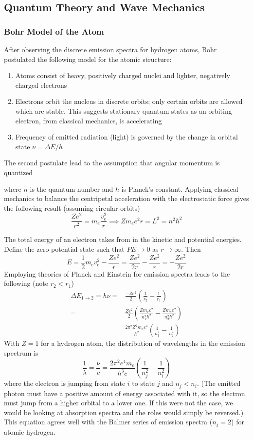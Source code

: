 \documentclass[11pt]{article}
\newcommand{\CenteredBoxed}[1]{\begin{center}\boxed{#1}\end{center}}
\begin{document}
\subsection{Quantum Theory and Wave Mechanics}
\subsubsection{Bohr Model of the Atom}
After observing the discrete emission spectra for hydrogen atoms, Bohr postulated the following model for the atomic structure:
\begin{enumerate}
\item Atoms consist of heavy, positively charged nuclei and lighter, negatively charged electrons
\item Electrons orbit the nucleus in discrete orbits; only certain orbits are allowed which are stable. This suggests stationary quantum states as an orbiting electron, from classical mechanics, is accelerating
\item Frequency of emitted radiation (light) is governed by the change in orbital state $\nu=\Delta E/h$
\end{enumerate}

The second postulate lead to the assumption that angular momentum is quantized
\CenteredBoxed{L = m_ev_er = m_e\omega r = n\frac{h}{2\pi} = n\hbar}
where $n$ is the quantum number and $h$ is Planck's constant. Applying classical mechanics to balance the centripetal acceleration with the electrostatic force gives the following result (assuming circular orbits)
$$\frac{Ze^2}{r^2} = m_e\frac{v_e^2}{r}\implies Zm_ee^2r = L^2 = n^2\hbar^2$$

The total energy of an electron takes from in the kinetic and potential energies. Define the zero potential state such that $PE\to0$ as $r\to\infty$. Then
$$E = \frac{1}{2}m_ev_e^2 -\frac{Ze^2}{r} = \frac{Ze^2}{2r} - \frac{Ze^2}{r} = -\frac{Ze^2}{2r}$$
Employing theories of Planck and Einstein for emission spectra leads to the following (note $r_2 < r_1$)
\begin{align*}
\Delta E_{1\to2} = h\nu =& \frac{-Ze^2}{2}\left(\frac{1}{r_2}-\frac{1}{r_1}\right)\\
=& \frac{Ze^2}{2}\left(\frac{Zm_ee^2}{n_1^2\hbar^2}-\frac{Zm_ee^2}{n_2^2\hbar^2}\right)\\
=& \frac{2\pi^2Z^2m_ee^4}{h^2}\left(\frac{1}{n_1^2}-\frac{1}{n_2^2}\right)
\end{align*}
With $Z=1$ for a hydrogen atom, the distribution of wavelengths in the emission spectrum is
$$\frac{1}{\lambda}=\frac{\nu}{c} = \frac{2\pi^2e^4m_e}{h^3c}\left(\frac{1}{n_j^2} - \frac{1}{n_i^2}\right)$$
where the electron is jumping from state $i$ to state $j$ and $n_j < n_i$. (The emitted photon must have a positive amount of energy associated with it, so the electron must jump from a higher orbital to a lower one. If this were not the case, we would be looking at absorption spectra and the roles would simply be reversed.) This equation agrees well with the Balmer series of emission spectra ($n_j=2$) for atomic hydrogen.\\
\end{document}
